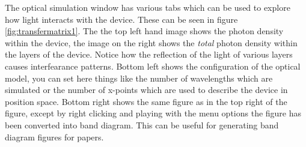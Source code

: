 The optical simulation window has various tabs which can be used to explore how light interacts with the device. These can be seen in figure \ref{fig:transfermatrix1}. The the top left hand image shows the photon density within the device, the image on the right shows the \emph{total} photon density within the layers of the device.  Notice how the reflection of the light of various layers causes interfearance patterns.  Bottom left shows the configuration of the optical model, you can set here things like the number of wavelengths which are simulated or the number of x-points which are used to describe the device in position space. Bottom right shows the same figure as in the top right of the figure, except by right clicking and playing with the menu options the figure has been converted into band diagram.  This can be useful for generating band diagram figures for papers.
  
